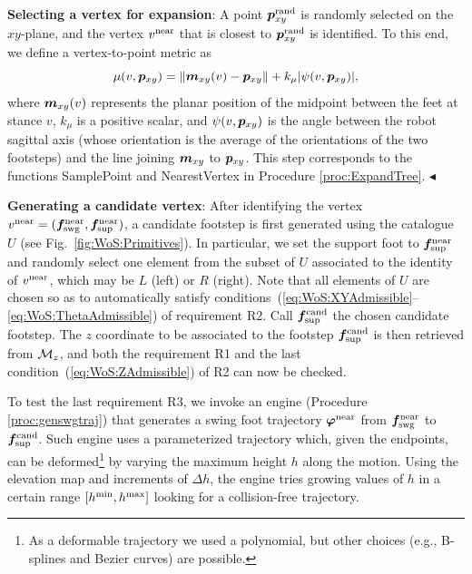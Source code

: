 {\bf Selecting a vertex for expansion}: A point ${\bm{p}}_{xy}^{\rm rand}$ is
randomly selected on the $xy$-plane, and
the vertex $v^{\rm near}$ that is closest to ${\bm{p}}_{xy}^{\rm rand}$ is
identified. To this end, we define a vertex-to-point metric as
\begin{equation*}
\mu(v, {\bm{p}}_{xy}) = \lVert {\bm{m}}_{xy}(v) - {\bm{p}}_{xy} \rVert + k_{\mu} |\psi(v,{\bm{p}}_{xy})|,
\end{equation*}
where ${\bm{m}}_{xy}(v)$ represents the planar position of the midpoint between the
feet at stance $v$, $k_{\mu}$ is a positive scalar, and $\psi(v,{\bm{p}}_{xy})$ is
the angle between the robot sagittal axis (whose orientation is the average of
the orientations of the two footsteps) and the line joining ${\bm{m}}_{xy}$ to
${\bm{p}}_{xy}$. This step corresponds to the functions SamplePoint and
NearestVertex in Procedure \ref{proc:ExpandTree}.
\hfill $\blacktriangleleft$

\begin{sloppypar}
{\bf Generating a candidate vertex}:  
After identifying the vertex
${v^{\rm near}=({\bm{f}}_{\rm swg}^{\rm near},{\bm{f}}_{\rm sup}^{\rm near})}$,
a candidate footstep is first generated using the catalogue $U$
(see Fig.~\ref{fig:WoS:Primitives}). In particular, we set the support foot to
${\bm{f}}_{\rm sup}^{\rm near}$ and randomly select one element from the subset of
$U$ associated to the identity of $v^{\rm near}$, which may be $L$ (left) or
$R$ (right). Note that all elements of $U$ are chosen so as to automatically
satisfy conditions~(\ref{eq:WoS:XYAdmissible}--\ref{eq:WoS:ThetaAdmissible})
of requirement R2. Call ${\bm{f}}_{\rm sup}^{\rm cand}$ the chosen candidate
footstep. The $z$ coordinate to be associated to the footstep
${\bm{f}}_{\rm sup}^{\rm cand}$ is then retrieved from ${\cal M}_{z}$, and both
the requirement R1 and the last condition~(\ref{eq:WoS:ZAdmissible}) of R2 can
now be checked.
\end{sloppypar}

To test the last requirement R3, we invoke an engine
(Procedure \ref{proc:genswgtraj}) that generates a swing foot trajectory
${\bm{\varphi}}^{\rm near}$ from ${\bm{f}}_{\rm swg}^{\rm near}$ to
${\bm{f}}_{\rm sup}^{\rm cand}$. Such engine uses a parameterized trajectory which,
given the endpoints, can be deformed\footnote{As a deformable trajectory we
used a polynomial, but other choices (e.g., B-splines and Bezier curves) are
possible.} by varying the maximum height $h$ along the motion. 
Using the elevation map and increments of $\Delta h$, the engine tries growing
values of $h$ in a certain range $[h^{\rm min}, h^{\rm max}]$ looking for a
collision-free trajectory.

